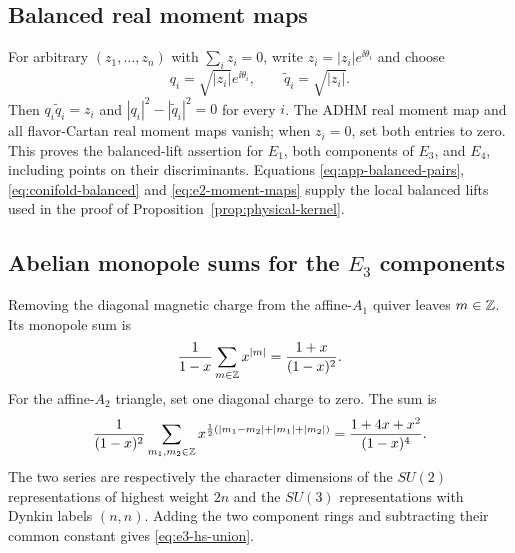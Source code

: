 \subsection{Balanced real moment maps}

For arbitrary $(z_1,\ldots,z_n)$ with $\sum_i z_i=0$, write
$z_i=|z_i|e^{\ii\theta_i}$ and choose
\begin{equation}
 q_i=\sqrt{|z_i|}e^{\ii\theta_i},
 \qquad
 \widetilde q_i=\sqrt{|z_i|}.
 \label{eq:app-balanced-pairs}
\end{equation}
Then $q_i\widetilde q_i=z_i$ and
$|q_i|^2-|\widetilde q_i|^2=0$ for every $i$. The ADHM real moment map and all
flavor-Cartan real moment maps vanish; when $z_i=0$, set both entries to zero.
This proves the balanced-lift assertion for $E_1$, both components of $E_3$,
and $E_4$, including points on their discriminants. Equations
\eqref{eq:app-balanced-pairs},
\eqref{eq:conifold-balanced} and \eqref{eq:e2-moment-maps} supply the local
balanced lifts used in the proof of Proposition~\ref{prop:physical-kernel}.

\subsection[Abelian monopole sums for the E3 components]{Abelian monopole sums for the $E_3$ components}

Removing the diagonal magnetic charge from the affine-$A_1$ quiver leaves
$m\in\mathbb Z$. Its monopole sum is
\begin{equation}
 \frac1{1-x}\sum_{m\in\mathbb Z}x^{|m|}
 =\frac{1+x}{(1-x)^2}.
\end{equation}
For the affine-$A_2$ triangle, set one diagonal charge to zero. The sum is
\begin{equation}
 \frac1{(1-x)^2}
 \sum_{m_1,m_2\in\mathbb Z}
 x^{\frac12(|m_1-m_2|+|m_1|+|m_2|)}
 =\frac{1+4x+x^2}{(1-x)^4}.
\end{equation}
The two series are respectively the character dimensions of the
$SU(2)$ representations of highest weight $2n$ and the $SU(3)$
representations with Dynkin labels $(n,n)$. Adding the two component rings and
subtracting their common constant gives \eqref{eq:e3-hs-union}.
